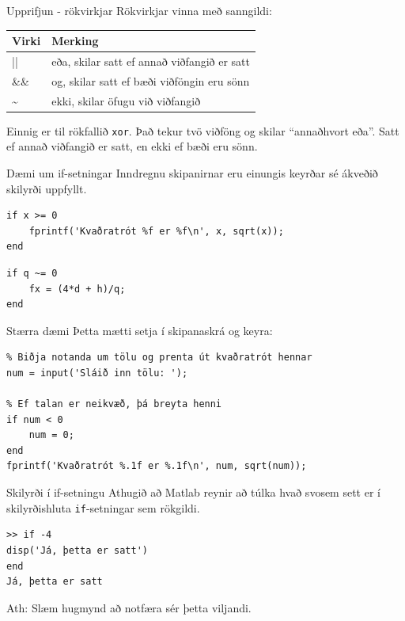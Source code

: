 \documentclass{beamer}
\begin{document}
\begin{frame}{Upprifjun - rökvirkjar}
Rökvirkjar vinna með sanngildi:
\begin{center}
\begin{tabular}{ll}
\toprule
Virki&Merking\\
\midrule
||& eða, skilar satt ef annað viðfangið er satt\\
\&\& & og, skilar satt ef bæði viðföngin eru sönn\\
\~{} &ekki, skilar öfugu við viðfangið\\
\bottomrule
\end{tabular}
\end{center}
Einnig er til rökfallið \texttt{xor}. Það tekur tvö viðföng og skilar ``annaðhvort eða''. Satt ef annað viðfangið er satt, en ekki ef bæði eru sönn.
\end{frame}

\begin{frame}[fragile]{Dæmi um if-setningar}
Inndregnu skipanirnar eru einungis keyrðar sé ákveðið skilyrði uppfyllt.
\begin{verbatim}
if x >= 0
    fprintf('Kvaðratrót %f er %f\n', x, sqrt(x));
end
\end{verbatim}

\begin{verbatim}
if q ~= 0
    fx = (4*d + h)/q;
end
\end{verbatim}

\end{frame}

\begin{frame}[fragile]{Stærra dæmi}
Þetta mætti setja í skipanaskrá og keyra:
\begin{verbatim}
% Biðja notanda um tölu og prenta út kvaðratrót hennar
num = input('Sláið inn tölu: ');

% Ef talan er neikvæð, þá breyta henni
if num < 0
    num = 0;
end
fprintf('Kvaðratrót %.1f er %.1f\n', num, sqrt(num));
\end{verbatim}
\end{frame}

\begin{frame}[fragile]{Skilyrði í if-setningu}
Athugið að Matlab reynir að túlka hvað svosem sett er í skilyrðishluta \texttt{if}-setningar sem rökgildi.

\begin{verbatim}
>> if -4
disp('Já, þetta er satt')
end
Já, þetta er satt
\end{verbatim}
Ath: Slæm hugmynd að notfæra sér þetta viljandi.
\end{frame}
\end{document}
